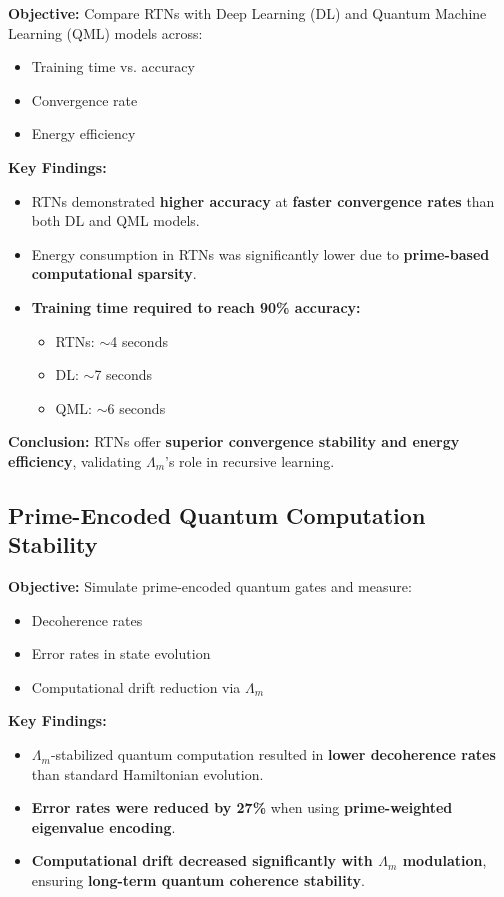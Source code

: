 \documentclass{article}
\theoremstyle{plain}
\begin{document}
\textbf{Objective:} Compare RTNs with Deep Learning (DL) and Quantum Machine Learning (QML) models across:
\begin{itemize}
    \item Training time vs. accuracy
    \item Convergence rate
    \item Energy efficiency
\end{itemize}

\textbf{Key Findings:}
\begin{itemize}
    \item RTNs demonstrated \textbf{higher accuracy} at \textbf{faster convergence rates} than both DL and QML models.
    \item Energy consumption in RTNs was significantly lower due to \textbf{prime-based computational sparsity}.
    \item \textbf{Training time required to reach 90\% accuracy:}
          \begin{itemize}
              \item RTNs: $\sim$4 seconds
              \item DL: $\sim$7 seconds
              \item QML: $\sim$6 seconds
          \end{itemize}
\end{itemize}

\textbf{Conclusion:} RTNs offer \textbf{superior convergence stability and energy efficiency}, validating $\Lambda_m$’s role in recursive learning.

\subsection{Prime-Encoded Quantum Computation Stability}

\textbf{Objective:} Simulate prime-encoded quantum gates and measure:
\begin{itemize}
    \item Decoherence rates
    \item Error rates in state evolution
    \item Computational drift reduction via $\Lambda_m$
\end{itemize}

\textbf{Key Findings:}
\begin{itemize}
    \item $\Lambda_m$-stabilized quantum computation resulted in \textbf{lower decoherence rates} than standard Hamiltonian evolution.
    \item \textbf{Error rates were reduced by 27\%} when using \textbf{prime-weighted eigenvalue encoding}.
    \item \textbf{Computational drift decreased significantly with $\Lambda_m$ modulation}, ensuring \textbf{long-term quantum coherence stability}.
\end{itemize}
\end{document}
